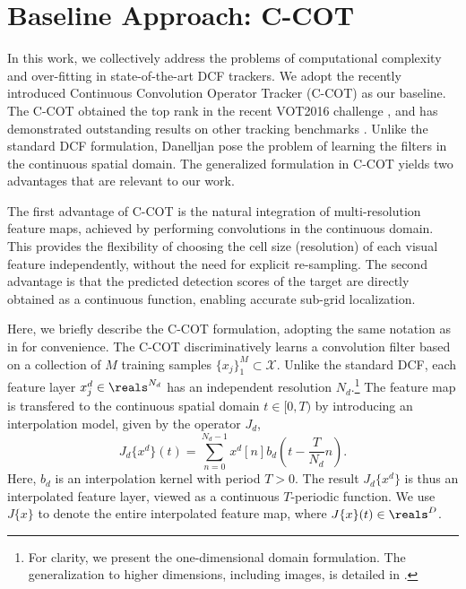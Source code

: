 \documentclass[10pt,twocolumn,letterpaper]{article}
\begin{document}
\section{Baseline Approach: C-COT}
\label{sec:CCOT}

In this work, we collectively address the problems of computational complexity and over-fitting in state-of-the-art DCF trackers. We adopt the recently introduced Continuous Convolution Operator Tracker (C-COT) \cite{DanelljanECCV2016} as our baseline. The C-COT obtained the top rank in the recent VOT2016 challenge \cite{VOT2016}, and has demonstrated outstanding results on other tracking benchmarks \cite{TempleColor,OTB2015}. Unlike the standard DCF formulation, Danelljan \etal \cite{DanelljanECCV2016} pose the problem of learning the filters in the continuous spatial domain. The generalized formulation in C-COT yields two advantages that are relevant to our work.

The first advantage of C-COT is the natural integration of multi-resolution feature maps, achieved by performing convolutions in the continuous domain. This provides the flexibility of choosing the cell size (\ie resolution) of each visual feature independently, without the need for explicit re-sampling.
The second advantage is that the predicted detection scores of the target are directly obtained as a continuous function, enabling accurate sub-grid localization.


Here, we briefly describe the C-COT formulation, adopting the same notation as in \cite{DanelljanECCV2016} for convenience. The C-COT discriminatively learns a convolution filter based on a collection of $M$ training samples $\{x_j\}_1^M \subset \mathcal{X}$. Unlike the standard DCF, each feature layer $x_j^d \in \reals^{N_d}$ has an independent resolution $N_d$.\footnote{For clarity, we present the one-dimensional domain formulation. The generalization to higher dimensions, including images, is detailed in \cite{DanelljanECCV2016}.} The feature map is transfered to the continuous spatial domain $t \in [0, T)$ by introducing an interpolation model, given by the operator $J_d$,
\begin{equation}
\label{eq:interp_op}
J_d \big\{x^d\big\} (t) = \sum_{n=0}^{N_d-1} x^d[n] b_d\left(t - \frac{T}{N_d} n\right) .
\end{equation}
Here, $b_d$ is an interpolation kernel with period $T > 0$. The result $J_d \big\{x^d\big\}$ is thus an interpolated feature layer, viewed as a continuous $T$-periodic function. We use $J \{x\}$ to denote the entire interpolated feature map, where $J \{x\}(t) \in \reals^D$.
\end{document}
